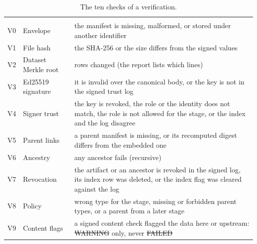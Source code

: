 {\tablefont
\begin{xltabular}{\textwidth}{P{0.75cm}P{3.2cm}L}
\caption{The ten checks of a verification.}\label{tab:checks}\\
\toprule
\headrow\hd{} &  &  \\
\midrule
\endfirsthead
\toprule
\headrow\hd{} &  &  \\
\midrule
\endhead
\bottomrule
\endfoot
V0 & Envelope & the manifest is missing, malformed, or stored under another identifier \\
V1 & File hash & the SHA-256 or the size differs from the signed values \\
V2 & Dataset Merkle root & rows changed (the report lists which lines) \\
V3 & Ed25519 signature & it is invalid over the canonical body, or the key is not in the signed trust log \\
V4 & Signer trust & the key is revoked, the role or the identity does not match, the role is not allowed for the stage, or the index and the log disagree \\
V5 & Parent links & a parent manifest is missing, or its recomputed digest differs from the embedded one \\
V6 & Ancestry & any ancestor fails (recursive) \\
V7 & Revocation & the artifact or an ancestor is revoked in the signed log, its index row was deleted, or the index flag was cleared against the log \\
V8 & Policy & wrong type for the stage, missing or forbidden parent types, or a parent from a later stage \\
V9 & Content flags & a signed content check flagged the data here or upstream: \st{WARNING} only, never \st{FAILED} \\
\end{xltabular}}

